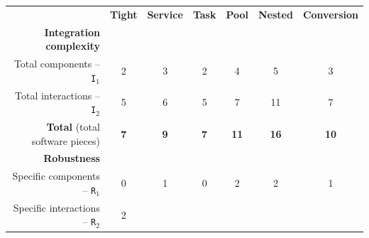 \documentclass[preprint,3p,twocolumn]{elsarticle}
\begin{document}
\begin{table}
\footnotesize
\centering
\begin{tabular}{rcccccc}
                                     & \textbf{Tight}
                                     & \textbf{Service}
                                     & \textbf{Task}
                                     & \textbf{Pool}
                                     & \textbf{Nested}
                                     & \textbf{Conversion} \\
\cellcolor[HTML]{EEEEEE}\textbf{Integration complexity}& \multicolumn{6}{l}{\cellcolor[HTML]{EEEEEE}}\\
  Total components -- \texttt{I$_1$} & \cellcolor[HTML]{99FF99}2
                                     & \cellcolor[HTML]{99DD99}3
                                     & \cellcolor[HTML]{99FF99}2
                                     & \cellcolor[HTML]{99BB99}4
                                     & \cellcolor[HTML]{999999}5
                                     & \cellcolor[HTML]{99DD99}3\\
Total interactions -- \texttt{I$_2$} & \cellcolor[HTML]{99FF99}5
                                     & \cellcolor[HTML]{99EE99}6
                                     & \cellcolor[HTML]{99FF99}5
                                     & \cellcolor[HTML]{99DD99}7
                                     & \cellcolor[HTML]{999999}11
                                     & \cellcolor[HTML]{99DD99}7\\
\textbf{Total} (total software pieces) & \cellcolor[HTML]{99FF99}\textbf{7}
                                     & \cellcolor[HTML]{99E899}\textbf{9}
                                     & \cellcolor[HTML]{99FF99}\textbf{7}
                                     & \cellcolor[HTML]{99D299}\textbf{11}
                                     & \cellcolor[HTML]{999999}\textbf{16}
                                     & \cellcolor[HTML]{99DD99}\textbf{10}\\
\cellcolor[HTML]{EEEEEE}\textbf{Robustness}& \multicolumn{6}{l}{\cellcolor[HTML]{EEEEEE}}\\
Specific components -- \texttt{R$_1$} & \cellcolor[HTML]{99FF99}0
                                     & \cellcolor[HTML]{99CC99}1
                                     & \cellcolor[HTML]{99FF99}0
                                     & \cellcolor[HTML]{999999}2
                                     & \cellcolor[HTML]{999999}2
                                     & \cellcolor[HTML]{99CC99}1\\
  Specific interactions -- \texttt{R$_2$} & \cellcolor[HTML]{99EB99}2

\end{tabular}
\end{table}
\end{document}
